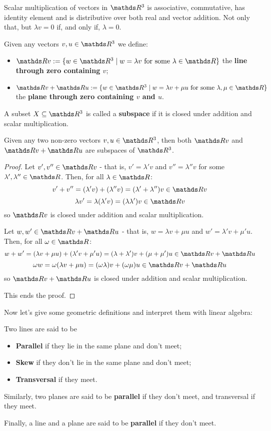 \begin{prop}
	Scalar multiplication of vectors in $\R^3$ is associative, commutative, has identity element and is distributive over both real and vector addition. Not only that, but $\lambda v=0$ if, and only if, $\lambda =0$.
\end{prop}

\begin{df}
	Given any vectors $v,u\in\R^3$ we define:
	\begin{itemize}
		\item $\R v:=\{w\in \R^3\mid w=\lambda v\mbox{ for some }\lambda\in \R\}$ the \textbf{line through zero containing $v$};
		\item $\R v+\R u:=\{w\in \R^3\mid w=\lambda v+\mu u\mbox{ for some }\lambda,\mu\in \R\}$ the \textbf{plane through zero containing $v$ and $u$}. 
	\end{itemize}
\end{df}

\begin{df}
	A subset $X\subseteq\R^3$ is called a \textbf{subspace} if it is closed under addition and scalar multiplication.
\end{df}

\begin{prop}
	Given any two non-zero vectors $v,u\in\R^3$, then both $\R v$ and $\R v+\R u$ are subspaces of $\R^3$.
\end{prop}
\begin{proof}
	Let $v',v''\in \R v$ - that is, $v'=\lambda' v$ and $v''=\lambda'' v$ for some $\lambda',\lambda''\in \R$. Then, for all $\lambda\in \R$:
	\[v'+v''=(\lambda' v)+(\lambda ''v)=(\lambda'+\lambda'')v\in \R v\]
	\[\lambda v'=\lambda(\lambda' v)=(\lambda \lambda')v\in \R v\]so $\R v$ is closed under addition and scalar multiplication.
	
	
	Let $w,w'\in \R v+\R u$ - that is, $w=\lambda v+\mu u$ and $w'=\lambda' v+\mu' u$. Then, for all $\omega \in \R$:
	\[w+w'=(\lambda v+\mu u)+(\lambda' v+\mu' u)=(\lambda+\lambda ')v+(\mu+\mu')u\in \R v+\R u\]
	\[\omega w=\omega(\lambda v+\mu u)=(\omega \lambda)v+(\omega \mu)u\in \R v+\R u\]so $\R v+\R u$ is closed under addition and scalar multiplication.
	
	This ends the proof.
\end{proof}

Now let's give some geometric definitions and interpret them with linear algebra:

\begin{df}
	Two lines are said to be
	\begin{itemize}
		\item \textbf{Parallel} if they lie in the same plane and don't meet;
		\item \textbf{Skew} if they don't lie in the same plane and don't meet;
		\item \textbf{Transversal} if they meet.
	\end{itemize}

Similarly, two planes are said to be \textbf{parallel} if they don't meet, and transversal if they meet.

Finally, a line and a plane are said to be \textbf{parallel} if they don't meet.
\end{df}

